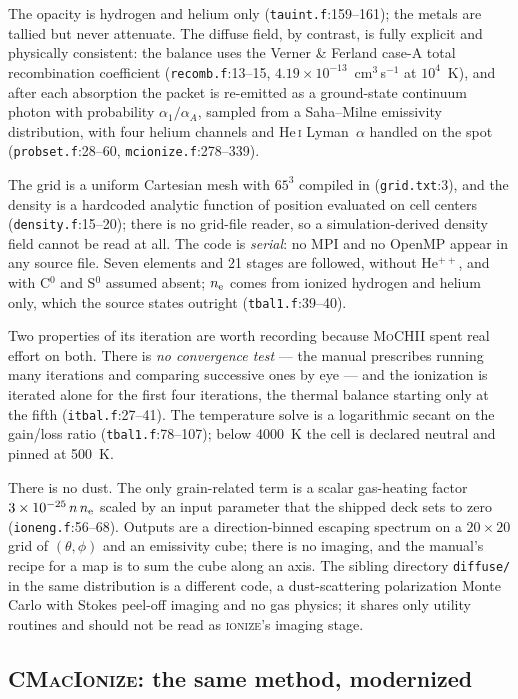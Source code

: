 \documentclass[english,a4paper]{my_memo}
\newcommand{\code}[1]{\texttt{#1}}
\newcommand{\MoCHII}{\textsc{MoCHII}}
\newcommand{\Wood}{\textsc{ionize}}
\newcommand{\CMI}{\textsc{CMacIonize}}
\newcommand{\HeI}{He\,\textsc{i}}
\newcommand{\nelec}{n_{\rm e}}
\begin{document}
The opacity is hydrogen and helium only
(\code{tauint.f}:159--161); the metals are tallied but never attenuate.  The
diffuse field, by contrast, is fully explicit and physically consistent: the
balance uses the Verner \& Ferland case-A total recombination coefficient
(\code{recomb.f}:13--15, $4.19\times10^{-13}$~cm$^3$\,s$^{-1}$ at
$10^4$~K), and after each absorption the packet is re-emitted as a
ground-state continuum photon with probability $\alpha_1/\alpha_A$, sampled
from a Saha--Milne emissivity distribution, with four helium channels and
\HeI{} Lyman~$\alpha$ handled on the spot
(\code{probset.f}:28--60, \code{mcionize.f}:278--339).

The grid is a uniform Cartesian mesh with $65^3$ compiled in
(\code{grid.txt}:3), and the density is a hardcoded analytic function of
position evaluated on cell centers (\code{density.f}:15--20); there is no
grid-file reader, so a simulation-derived density field cannot be read at
all.  The code is \emph{serial}: no MPI and no OpenMP appear in any source
file.  Seven elements and 21 stages are followed, without He$^{++}$, and
with C$^0$ and S$^0$ assumed absent; $\nelec$ comes from ionized hydrogen and
helium only, which the source states outright (\code{tbal1.f}:39--40).

Two properties of its iteration are worth recording because \MoCHII{} spent
real effort on both.  There is \emph{no convergence test} --- the manual
prescribes running many iterations and comparing successive ones by eye ---
and the ionization is iterated alone for the first four iterations, the
thermal balance starting only at the fifth (\code{itbal.f}:27--41).  The
temperature solve is a logarithmic secant on the gain/loss ratio
(\code{tbal1.f}:78--107); below 4000~K the cell is declared neutral and
pinned at 500~K.

There is no dust.  The only grain-related term is a scalar gas-heating
factor $3\times10^{-25}\,n\,\nelec$ scaled by an input parameter that the
shipped deck sets to zero (\code{ioneng.f}:56--68).  Outputs are a
direction-binned escaping spectrum on a $20\times20$ grid of
$(\theta,\phi)$ and an emissivity cube; there is no imaging, and the manual's
recipe for a map is to sum the cube along an axis.  The sibling directory
\code{diffuse/} in the same distribution is a different code, a
dust-scattering polarization Monte Carlo with Stokes peel-off imaging and no
gas physics; it shares only utility routines and should not be read as
\Wood{}'s imaging stage.

\subsection{\CMI{}: the same method, modernized}
\end{document}
